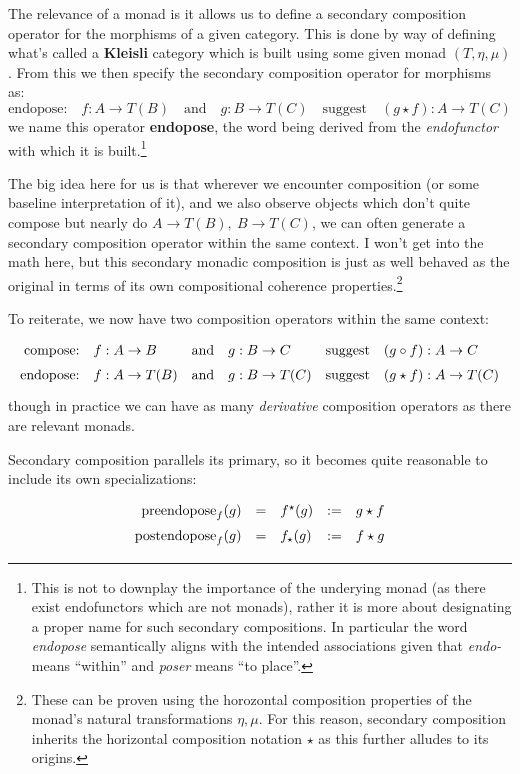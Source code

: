 \documentclass[twoside]{article}
\newcommand{\strong}[1]{{\bfseries #1}}
\newcommand{\prendopose}[1]{\ensuremath{\mbox{preendopose}_{#1}}}
\newcommand{\postndopose}[1]{\ensuremath{\mbox{postendopose}_{#1}}}
\begin{document}
The relevance of a monad is it allows us to define a secondary composition
operator for the morphisms of a given category. This is done by way of defining what's called a \strong{Kleisli} category which
is built using some given monad $ (T, \eta, \mu) $. From this we then specify the secondary composition operator for morphisms as:
$$ \mbox{endopose:} \quad f:A\to T(B) \quad \mbox{and} \quad  g:B\to T(C) \quad \mbox{suggest} \quad (g\star f):A\to T(C) $$
we name this operator \strong{endopose}, the word being derived from the \emph{endofunctor} with which it is
built.\footnote{This is not to downplay the importance of the underying monad (as there exist endofunctors which are not monads),
rather it is more about designating a proper name for such secondary compositions. In particular the word \emph{endopose}
semantically aligns with the intended associations given that \emph{endo-} means ``within'' and \emph{poser} means ``to place''.}

The big idea here for us is that wherever we encounter composition (or some baseline interpretation of it), and we also
observe objects which don't quite compose but nearly do $ A\to T(B),\ B\to T(C) $, we can often generate a secondary
composition operator within the same context. I won't get into the math here, but this secondary monadic composition
is just as well behaved as the original in terms of its own compositional coherence properties.\footnote{These can be
proven using the horozontal composition properties of the monad's natural transformations $ \eta, \mu $. For this reason,
secondary composition inherits the horizontal composition notation $ \star $ as this further alludes to its origins.}

To reiterate, we now have two composition operators within the same context:
$$ \def\arraystretch{1.5}
\begin{array}{rlclcl}
\mbox{compose:} & f:A\to B	& \mbox{and} & g:B\to C		& \mbox{suggest} & (g\circ f):A\to C		\\
\mbox{endopose:} & f:A\to T(B)	& \mbox{and} & g:B\to T(C)	& \mbox{suggest} & (g\star f):A\to T(C)
\end{array} $$
though in practice we can have as many \emph{derivative} composition operators as there are relevant monads.

Secondary composition parallels its primary, so it becomes quite reasonable to include its own specializations:
$$ \def\arraystretch{1.5}
\begin{array}{rclcl}
\prendopose{f}(g)	& = & f^\star(g)	& := & g \star f		\\
\postndopose{f}(g)	& = & f_\star(g)	& := & f \star g
\end{array} $$
\end{document}
